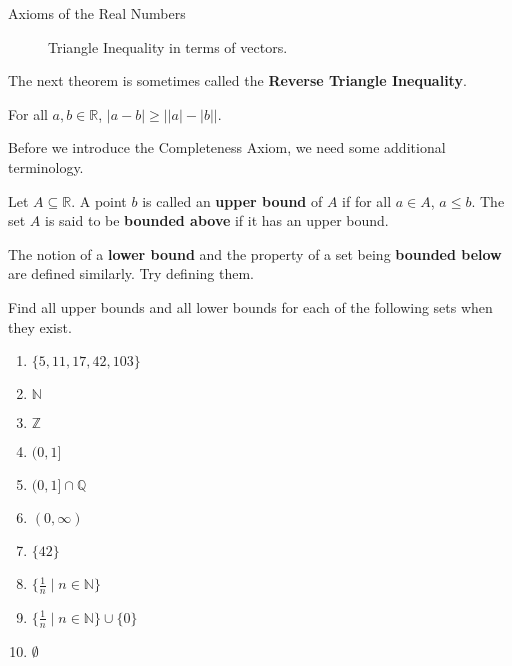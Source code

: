 \begin{section}{Axioms of the Real Numbers}
\begin{figure}[h!]
\centering

\caption{Triangle Inequality in terms of vectors.}\label{fig:triangle inequality 2d}
\end{figure}

The next theorem is sometimes called the \textbf{Reverse Triangle Inequality}.

\begin{theorem}
For all $a,b\in\mathbb{R}$, $|a-b|\geq \left||a|-|b| \right|$.
\end{theorem}

Before we introduce the Completeness Axiom, we need some additional terminology.

\begin{definition}
Let $A\subseteq \mathbb{R}$. A point $b$ is called an \textbf{upper bound} of $A$ if for all $a\in A$, $a\leq b$. The set $A$ is said to be \textbf{bounded above} if it has an upper bound.
\end{definition}

\begin{problem}
The notion of a \textbf{lower bound} and the property of a set being \textbf{bounded below} are defined similarly. Try defining them.
\end{problem}

\begin{problem}\label{prob:find upper bounds}
Find all upper bounds and all lower bounds for each of the following sets when they exist.
\begin{enumerate}[label=\textrm{(\alph*)}]
\item $\{5,11,17,42,103\}$ 
\item $\mathbb{N}$
\item $\mathbb{Z}$
\item $(0,1]$
\item $(0,1]\cap \mathbb{Q}$
\item $(0,\infty)$
\item $\{42\}$
\item $\{\frac{1}{n}\mid n\in\mathbb{N}\}$
\item $\{\frac{1}{n}\mid n\in\mathbb{N}\}\cup\{0\}$
\item $\emptyset$
\end{enumerate}
\end{problem}


\end{section}
